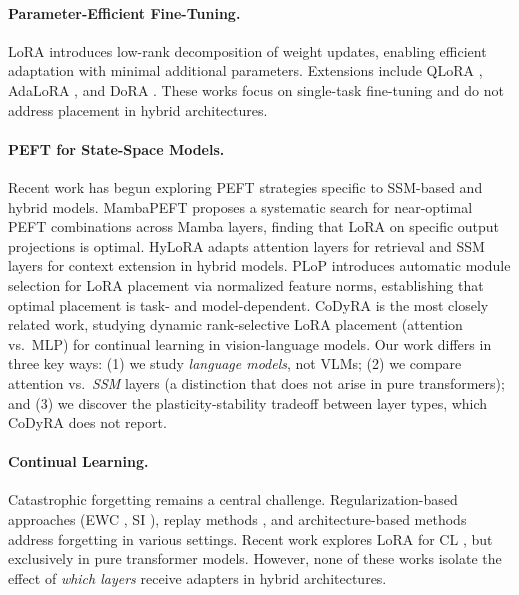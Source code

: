 \documentclass{article}
\begin{document}
\paragraph{Parameter-Efficient Fine-Tuning.}
LoRA \cite{hu2022lora} introduces low-rank decomposition of weight updates, enabling efficient adaptation with minimal additional parameters. Extensions include QLoRA \cite{dettmers2023qlora}, AdaLoRA \cite{zhang2023adalora}, and DoRA \cite{liu2024dora}. These works focus on single-task fine-tuning and do not address placement in hybrid architectures.

\paragraph{PEFT for State-Space Models.}
Recent work has begun exploring PEFT strategies specific to SSM-based and hybrid models. MambaPEFT \cite{mambapeft2024} proposes a systematic search for near-optimal PEFT combinations across Mamba layers, finding that LoRA on specific output projections is optimal. HyLoRA \cite{hylora2024} adapts attention layers for retrieval and SSM layers for context extension in hybrid models. PLoP \cite{plop2025} introduces automatic module selection for LoRA placement via normalized feature norms, establishing that optimal placement is task- and model-dependent. CoDyRA \cite{codyra2024} is the most closely related work, studying dynamic rank-selective LoRA placement (attention vs.\ MLP) for continual learning in vision-language models. Our work differs in three key ways: (1) we study \emph{language models}, not VLMs; (2) we compare attention vs.\ \emph{SSM} layers (a distinction that does not arise in pure transformers); and (3) we discover the plasticity-stability tradeoff between layer types, which CoDyRA does not report.

\paragraph{Continual Learning.}
Catastrophic forgetting \cite{mccloskey1989catastrophic, french1999catastrophic} remains a central challenge. Regularization-based approaches (EWC \cite{kirkpatrick2017overcoming}, SI \cite{zenke2017continual}), replay methods \cite{chaudhry2019tiny}, and architecture-based methods \cite{serra2018overcoming} address forgetting in various settings. Recent work explores LoRA for CL \cite{wang2023orthogonal, smith2023continual}, but exclusively in pure transformer models. However, none of these works isolate the effect of \emph{which layers} receive adapters in hybrid architectures.
\end{document}
